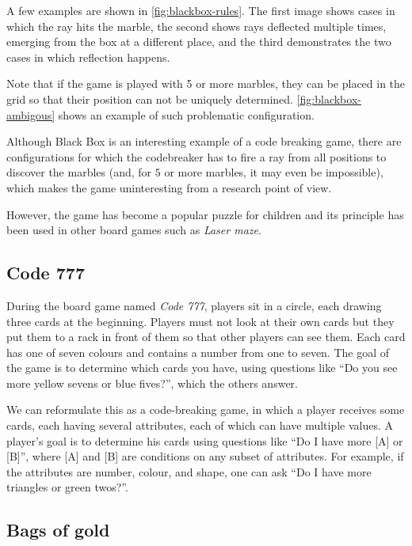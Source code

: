 
A few examples are shown in \autoref{fig:blackbox-rules}.
The first image shows cases in which the ray hits the marble,
  the second shows rays deflected multiple times, emerging from
  the box at a different place, and the third demonstrates
  the two cases in which reflection happens.

Note that if the game is played with 5 or more marbles,
  they can be placed in the grid so that their position can
  not be uniquely determined.
\autoref{fig:blackbox-ambigous} shows an example of such
  problematic configuration.

Although Black Box is an interesting example of a code breaking game,
  there are configurations for which the codebreaker has to fire a ray from
  all positions to discover the marbles
  (and, for $5$ or more marbles, it may even be impossible),
  which makes the game uninteresting from a research point of view.

However, the game has become a popular puzzle for children and
  its principle has been used in other board games such as \emph{Laser maze}\cite{lasermaze}.

\subsection{Code 777}

During the board game named \emph{Code 777}, players sit in a circle,
  each drawing three cards at the beginning.
Players must not look at their own cards but they put them to a rack in front of them
  so that other players can see them.
Each card has one of seven colours and contains a number from one to seven.
The goal of the game is to determine which cards you have, using questions like
 ``Do you see more yellow sevens or blue fives?'', which the others answer\cite{code777}.

We can reformulate this as a code-breaking game, in which a player
  receives some cards, each having several attributes, each of which can have
  multiple values.
A player's goal is to determine his cards using questions
  like ``Do I have more [A] or [B]'', where [A] and [B] are conditions on
  any subset of attributes.
For example, if the attributes are number, colour, and shape, one can ask
  ``Do I have more triangles or green twos?''.

\subsection{Bags of gold}

